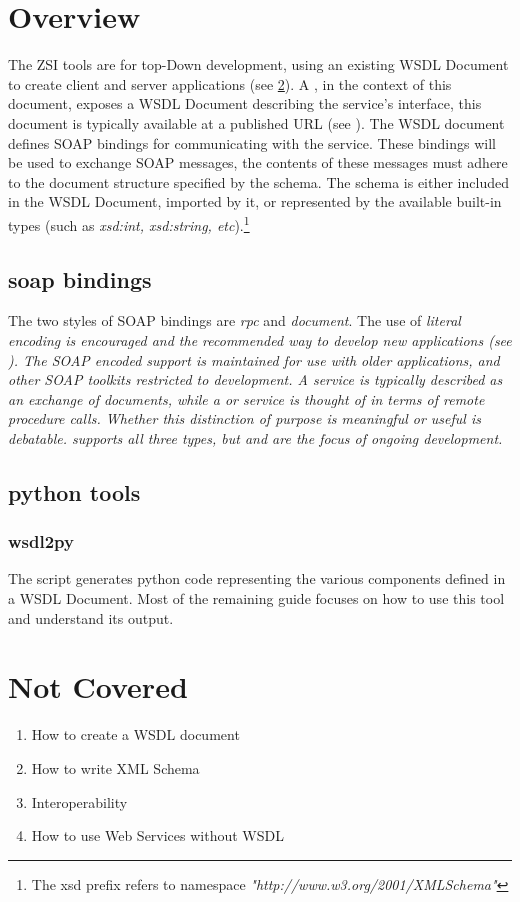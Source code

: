 \section{Overview}
The ZSI \WS tools are for top-Down \WS development, using an existing WSDL
Document to create client and server applications (see \ref{section:NC}). A \WS, in the context of this document, exposes a WSDL Document describing the
service's interface, this document is typically available at a published URL (see
\URL).  The WSDL document defines SOAP bindings for communicating with the
service. These bindings will be used to exchange SOAP messages, the contents of
these messages must adhere to the document structure specified by the schema. The
schema is either included in the WSDL Document, imported by it, or represented
by the available built-in types (such as \emph{xsd:int, xsd:string,
etc}).\footnote{The xsd prefix refers to namespace \it{"http://www.w3.org/2001/XMLSchema"}}

\subsection{soap bindings}
The two styles of SOAP bindings are \emph{rpc} and \emph{document}.  The use of
\it{literal} encoding is encouraged and the recommended way to develop new \WS
applications (see \WSI).  The SOAP \it{encoded} support is maintained for use
with older applications, and other SOAP toolkits restricted to \RPCENC development.  A
\DOCLIT service is typically described as an exchange of documents, while a
\RPCENC or \RPCLIT service is thought of in terms of remote procedure calls.
Whether this distinction of purpose is meaningful or useful is debatable.  \ZSI
supports all three types, but \RPCLIT and \DOCLIT are the focus of ongoing
development.

\subsection{python tools}
\subsubsection{wsdl2py}
The \WPY script generates python code representing the various components
defined in a WSDL Document.  Most of the remaining guide focuses on how to use
this tool and understand its output.


\section{Not Covered}
\label{section:NC}
\begin{enumerate}
 \item{How to create a WSDL document}
 \item {How to write XML Schema}
 \item {Interoperability}
 \item{How to use Web Services without WSDL}
\end{enumerate}



